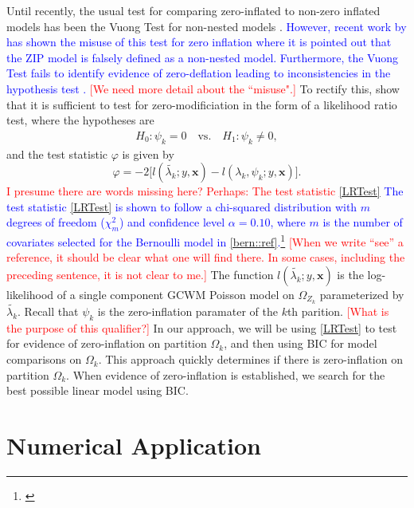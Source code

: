 \documentclass[11pt,letterpaper]{article}
\numberwithin{equation}{section}
\numberwithin{equation}{section}
\numberwithin{equation}{section}
\begin{document}
Until recently, the usual test for comparing zero-inflated to non-zero inflated models has been the Vuong Test for non-nested models \citep{vuongTest}. \textcolor{blue}{However, recent work by \cite[see][]{misuse} has shown the misuse of this test for zero inflation where it is pointed out that the ZIP model is falsely defined as a non-nested model. Furthermore, the Vuong Test fails to identify evidence of zero-deflation leading to inconsistencies in the hypothesis test \citep[see][]{misuse}.}  \textcolor{red}{[We need more detail about the ``misuse".]} To rectify this, \cite{newIntuitive} show that it is sufficient to test for zero-modificiation in the form of a likelihood ratio test, where the hypotheses are
\begin{align*}
& & H_0: \psi_k = 0 \quad \text{vs.} \quad H_1: \psi_k \neq 0, & &
\end{align*}
and the test statistic $\varphi$ is given by
\begin{equation}
\varphi = -2 \big[l(\tilde{\lambda_k}; y, \bm{x}) - l(\lambda_k, \psi_k; y , \bm{x} )\big].
\label{LRTest}
\end{equation}
\textcolor{red}{I presume there are words missing here? Perhaps: The test statistic \eqref{LRTest}} \textcolor{blue}{The test statistic \eqref{LRTest} is shown to follow a chi-squared distribution with $m$ degrees of freedom ($\chi^2_m $) and confidence level $\alpha = 0.10$, where $m$ is the number of covariates selected for the Bernoulli model in \eqref{bern::ref}.\footnote{\citep[see Liklihood Ratio Tests in ][]{newIntuitive}} } \textcolor{red}{[When we write ``see'' a reference, it should be clear what one will find there. In some cases, including the preceding sentence, it is not clear to me.]} The function 
$l(\tilde{\lambda_k}; y , \bm{x})$ is the log-likelihood of a single component GCWM Poisson model on $\Omega_{Z_k}$ parameterized by $\tilde{\lambda_k}$. Recall that $\psi_k$ is the zero-inflation paramater of the $k$th parition.  \textcolor{red}{[What is the purpose of this qualifier?]} In our approach, we will be using \eqref{LRTest} to  test for evidence of zero-inflation on partition $\Omega_k$, and then using BIC for model comparisons on $\Omega_k$. This approach quickly determines if there is zero-inflation on partition $\Omega_k$.  When evidence of zero-inflation is established, we search for the best possible linear model using BIC. 

\section{Numerical Application}\label{sec:numapp}
\end{document}
